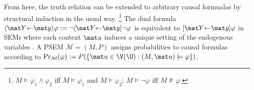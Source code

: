 From here, the truth relation can be extended to arbitrary causal formualas by structural induction in the usual way.
    \unskip\footnote{
    $M\! \models\! \varphi_1 \land \varphi_2$ iff $M \!\models\! \varphi_1$ and $M \!\models\! \varphi_2$;
    $M \!\models \lnot \varphi$ iff $M \!\not\models \varphi$. 
    }
The dual formula
$\langle \mat Y {\gets} \mat y\rangle \varphi := \lnot [\mat Y{\gets }\mat y]\lnot \varphi$
is equivalent 
to $[\mat Y {\gets} \mat y]\varphi$
in SEMs where each context $\mat u$ induces a unique setting of the endogenous variables \citep{halpern-2000}.
A PSEM $\mathcal M = (M, P)$ assigns probabilities to causal formulas according to $\Pr_{\mathcal M}(\varphi) := P(\{ \mat u \in \V(\U) : (M, \mat u) \models \varphi \})$.
% 



